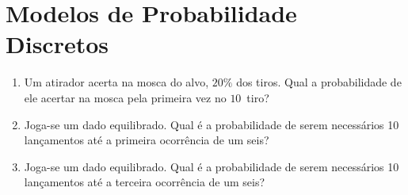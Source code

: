 \pagestyle{cap2}
\section*{Modelos de Probabilidade Discretos}

\begin{enumerate}
\item Um atirador acerta na mosca do alvo, $20\%$ dos tiros. Qual a probabilidade de ele acertar na mosca pela primeira vez no $10$\textordmasculine\ tiro?


\item Joga-se um dado equilibrado. Qual é a probabilidade de serem necessários 10 lançamentos até a primeira ocorrência de um seis?


\item Joga-se um dado equilibrado. Qual é a probabilidade de serem necessários 10 lançamentos até a terceira ocorrência de um seis?
	
\end{enumerate}
